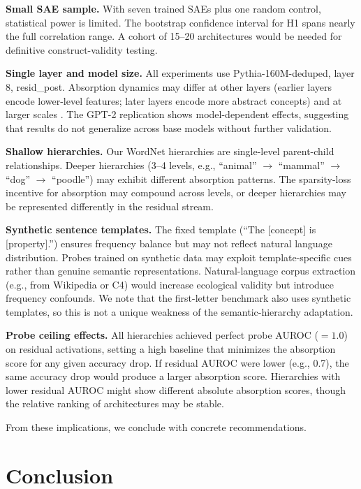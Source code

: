 \documentclass{article}
\begin{document}
\textbf{Small SAE sample.} With seven trained SAEs plus one random control, statistical power is limited. The bootstrap confidence interval for H1 spans nearly the full correlation range. A cohort of 15--20 architectures would be needed for definitive construct-validity testing.

\textbf{Single layer and model size.} All experiments use Pythia-160M-deduped, layer 8, resid\_post. Absorption dynamics may differ at other layers (earlier layers encode lower-level features; later layers encode more abstract concepts) and at larger scales \citep{templeton2024scaling}. The GPT-2 replication shows model-dependent effects, suggesting that results do not generalize across base models without further validation.

\textbf{Shallow hierarchies.} Our WordNet hierarchies are single-level parent-child relationships. Deeper hierarchies (3--4 levels, e.g., ``animal'' $\to$ ``mammal'' $\to$ ``dog'' $\to$ ``poodle'') may exhibit different absorption patterns. The sparsity-loss incentive for absorption may compound across levels, or deeper hierarchies may be represented differently in the residual stream.

\textbf{Synthetic sentence templates.} The fixed template (``The [concept] is [property].'') ensures frequency balance but may not reflect natural language distribution. Probes trained on synthetic data may exploit template-specific cues rather than genuine semantic representations. Natural-language corpus extraction (e.g., from Wikipedia or C4) would increase ecological validity but introduce frequency confounds. We note that the first-letter benchmark also uses synthetic templates, so this is not a unique weakness of the semantic-hierarchy adaptation.

\textbf{Probe ceiling effects.} All hierarchies achieved perfect probe AUROC ($= 1.0$) on residual activations, setting a high baseline that minimizes the absorption score for any given accuracy drop. If residual AUROC were lower (e.g., 0.7), the same accuracy drop would produce a larger absorption score. Hierarchies with lower residual AUROC might show different absolute absorption scores, though the relative ranking of architectures may be stable.

From these implications, we conclude with concrete recommendations.

\section{Conclusion}
\end{document}
